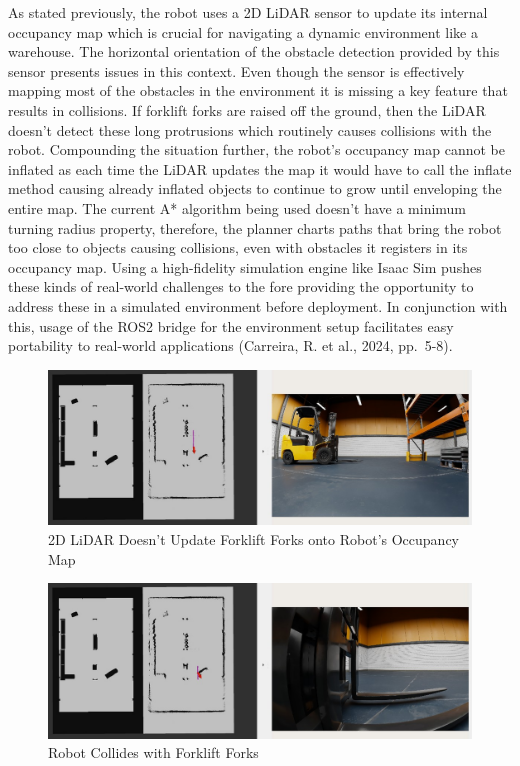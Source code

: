 \documentclass[
  letterpaper,
  DIV=11,
  numbers=noendperiod]{scrartcl}
\begin{document}
As stated previously, the robot uses a 2D LiDAR sensor to update its
internal occupancy map which is crucial for navigating a dynamic
environment like a warehouse. The horizontal orientation of the obstacle
detection provided by this sensor presents issues in this context. Even
though the sensor is effectively mapping most of the obstacles in the
environment it is missing a key feature that results in collisions. If
forklift forks are raised off the ground, then the LiDAR doesn't detect
these long protrusions which routinely causes collisions with the robot.
Compounding the situation further, the robot's occupancy map cannot be
inflated as each time the LiDAR updates the map it would have to call
the inflate method causing already inflated objects to continue to grow
until enveloping the entire map. The current A* algorithm being used
doesn't have a minimum turning radius property, therefore, the planner
charts paths that bring the robot too close to objects causing
collisions, even with obstacles it registers in its occupancy map. Using
a high-fidelity simulation engine like Isaac Sim pushes these kinds of
real-world challenges to the fore providing the opportunity to address
these in a simulated environment before deployment. In conjunction with
this, usage of the ROS2 bridge for the environment setup facilitates
easy portability to real-world applications (Carreira, R. et al., 2024,
pp.~5-8).

\begin{figure}

{\centering \includegraphics{lidar-limitation.png}

}

\caption{\label{fig-lidar-limitation}2D LiDAR Doesn't Update Forklift
Forks onto Robot's Occupancy Map}

\end{figure}

\begin{figure}

{\centering \includegraphics{robot-collision.png}

}

\caption{\label{fig-robot-collision}Robot Collides with Forklift Forks}

\end{figure}
\end{document}

